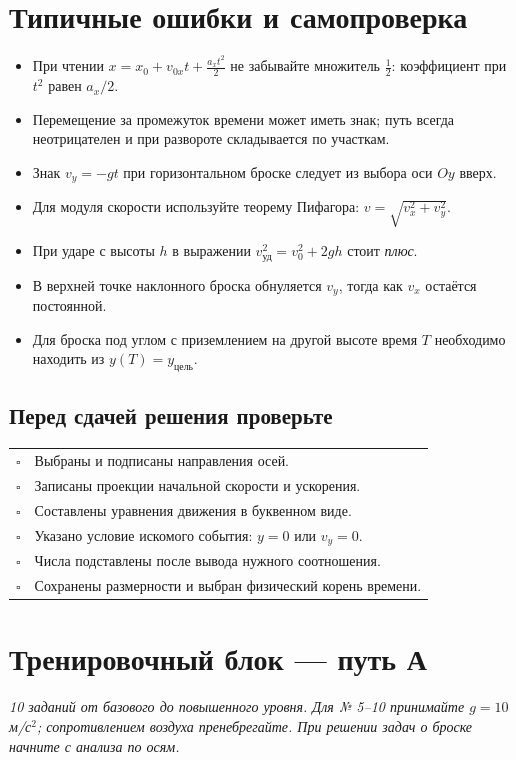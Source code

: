 \documentclass[a4paper,12pt]{article}
\begin{document}
\section{Типичные ошибки и самопроверка}
\begin{itemize}
\item При чтении $x=x_0+v_{0x}t+\frac{a_xt^2}{2}$ не забывайте множитель $\frac12$: коэффициент при $t^2$ равен $a_x/2$.
\item Перемещение за промежуток времени может иметь знак; путь всегда неотрицателен и при развороте складывается по участкам.
\item Знак $v_y=-gt$ при горизонтальном броске следует из выбора оси $Oy$ вверх.
\item Для модуля скорости используйте теорему Пифагора: $v=\sqrt{v_x^2+v_y^2}$.
\item При ударе с высоты $h$ в выражении $v_{\text{уд}}^2=v_0^2+2gh$ стоит \textit{плюс}.
\item В верхней точке наклонного броска обнуляется $v_y$, тогда как $v_x$ остаётся постоянной.
\item Для броска под углом с приземлением на другой высоте время $T$ необходимо находить из $y(T)=y_{\text{цель}}$.
\end{itemize}

\subsection{Перед сдачей решения проверьте}
\begin{tabularx}{\linewidth}{@{}lX@{}}
$\square$ & Выбраны и подписаны направления осей.\\
$\square$ & Записаны проекции начальной скорости и ускорения.\\
$\square$ & Составлены уравнения движения в буквенном виде.\\
$\square$ & Указано условие искомого события: $y=0$ или $v_y=0$.\\
$\square$ & Числа подставлены после вывода нужного соотношения.\\
$\square$ & Сохранены размерности и выбран физический корень времени.\\
\end{tabularx}

\clearpage
\section*{Тренировочный блок --- путь А}
\textit{10 заданий от базового до повышенного уровня. Для № 5--10 принимайте $g=10$ м/с$^2$; сопротивлением воздуха пренебрегайте. При решении задач о броске начните с анализа по осям.}
\end{document}
